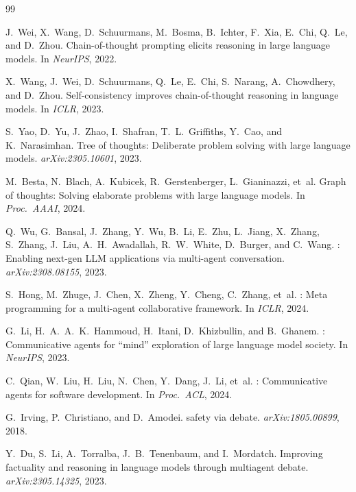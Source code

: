 \documentclass[11pt]{amsart}
\newcommand\1{{\mathds{1}}}
\theoremstyle{definition}
\theoremstyle{remark}
\numberwithin{equation}{section}
\begin{document}
\begin{thebibliography}{99}

J.~Wei, X.~Wang, D.~Schuurmans, M.~Bosma, B.~Ichter, F.~Xia, E.~Chi, Q.~Le, and D.~Zhou.
\newblock Chain-of-thought prompting elicits reasoning in large language models.
\newblock In \emph{NeurIPS}, 2022.

X.~Wang, J.~Wei, D.~Schuurmans, Q.~Le, E.~Chi, S.~Narang, A.~Chowdhery, and D.~Zhou.
\newblock Self-consistency improves chain-of-thought reasoning in language models.
\newblock In \emph{ICLR}, 2023.

S.~Yao, D.~Yu, J.~Zhao, I.~Shafran, T.~L.~Griffiths, Y.~Cao, and K.~Narasimhan.
\newblock Tree of thoughts: Deliberate problem solving with large language models.
\newblock \emph{arXiv:2305.10601}, 2023.

M.~Besta, N.~Blach, A.~Kubicek, R.~Gerstenberger, L.~Gianinazzi, et~al.
\newblock Graph of thoughts: Solving elaborate problems with large language models.
\newblock In \emph{Proc.\ AAAI}, 2024.

Q.~Wu, G.~Bansal, J.~Zhang, Y.~Wu, B.~Li, E.~Zhu, L.~Jiang, X.~Zhang, S.~Zhang, J.~Liu, A.~H.~Awadallah, R.~W.~White, D.~Burger, and C.~Wang.
: Enabling next-gen {LLM} applications via multi-agent conversation.
\newblock \emph{arXiv:2308.08155}, 2023.

S.~Hong, M.~Zhuge, J.~Chen, X.~Zheng, Y.~Cheng, C.~Zhang, et~al.
: Meta programming for a multi-agent collaborative framework.
\newblock In \emph{ICLR}, 2024.

G.~Li, H.~A.~A.~K.~Hammoud, H.~Itani, D.~Khizbullin, and B.~Ghanem.
: Communicative agents for ``mind'' exploration of large language model society.
\newblock In \emph{NeurIPS}, 2023.

C.~Qian, W.~Liu, H.~Liu, N.~Chen, Y.~Dang, J.~Li, et~al.
: Communicative agents for software development.
\newblock In \emph{Proc.\ ACL}, 2024.

G.~Irving, P.~Christiano, and D.~Amodei.
 safety via debate.
\newblock \emph{arXiv:1805.00899}, 2018.

Y.~Du, S.~Li, A.~Torralba, J.~B.~Tenenbaum, and I.~Mordatch.
\newblock Improving factuality and reasoning in language models through multiagent debate.
\newblock \emph{arXiv:2305.14325}, 2023.


\end{thebibliography}
\end{document}
